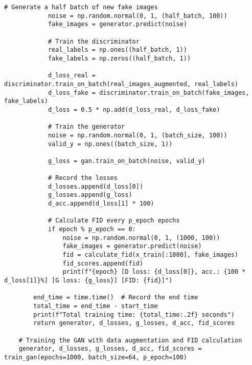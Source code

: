\begin{lstlisting}[style=mypython, caption= { Explore Data Augmentaion (rotation 10, width and height shift 0.1 \\ and  horizontal flip)}, captionpos=t]
            # Generate a half batch of new fake images
            noise = np.random.normal(0, 1, (half_batch, 100))
            fake_images = generator.predict(noise)
    
            # Train the discriminator
            real_labels = np.ones((half_batch, 1))
            fake_labels = np.zeros((half_batch, 1))
    
            d_loss_real = discriminator.train_on_batch(real_images_augmented, real_labels)
            d_loss_fake = discriminator.train_on_batch(fake_images, fake_labels)
            d_loss = 0.5 * np.add(d_loss_real, d_loss_fake)
    
            # Train the generator
            noise = np.random.normal(0, 1, (batch_size, 100))
            valid_y = np.ones((batch_size, 1))
    
            g_loss = gan.train_on_batch(noise, valid_y)
    
            # Record the losses
            d_losses.append(d_loss[0])
            g_losses.append(g_loss)
            d_acc.append(d_loss[1] * 100)
            
            # Calculate FID every p_epoch epochs
            if epoch % p_epoch == 0:
                noise = np.random.normal(0, 1, (1000, 100))
                fake_images = generator.predict(noise)
                fid = calculate_fid(x_train[:1000], fake_images)
                fid_scores.append(fid)
                print(f"{epoch} [D loss: {d_loss[0]}, acc.: {100 * d_loss[1]}%] [G loss: {g_loss}] [FID: {fid}]")
    
        end_time = time.time()  # Record the end time
        total_time = end_time - start_time
        print(f"Total training time: {total_time:.2f} seconds")
        return generator, d_losses, g_losses, d_acc, fid_scores
    
    # Training the GAN with data augmentation and FID calculation
    generator, d_losses, g_losses, d_acc, fid_scores = train_gan(epochs=1000, batch_size=64, p_epoch=100)
\end{lstlisting}


